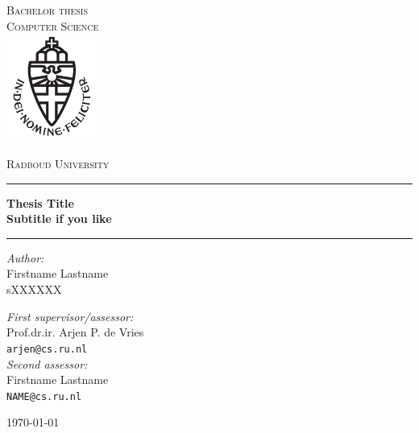 \documentclass[11pt,a4paper]{report}
\begin{document}
\begin{titlepage}
\begin{center}
\textsc{\LARGE Bachelor thesis\\Computer Science}\\[1.5cm]
\includegraphics[height=100pt]{logo}

\vspace{0.4cm}
\textsc{\Large Radboud University}\\[1cm]
\hrule
\vspace{0.4cm}
\textbf{\huge Thesis Title\\[0.3cm]
\LARGE Subtitle if you like
}\\[0.4cm]
\hrule
\vspace{2cm}
\begin{minipage}[t]{0.45\textwidth}
\begin{flushleft} \large
\textit{Author:}\\
Firstname Lastname\\
sXXXXXX
\end{flushleft}
\end{minipage}
\begin{minipage}[t]{0.45\textwidth}
\begin{flushright} \large
\textit{First supervisor/assessor:}\\
Prof.dr.ir. Arjen P. de Vries\\
\texttt{arjen@cs.ru.nl}\\[1.3cm]
\textit{Second assessor:}\\
Firstname Lastname\\
\texttt{NAME@cs.ru.nl}
\end{flushright}
\end{minipage}
\vfill
{\large \today}
\end{center}
\end{titlepage}


\tableofcontents








\appendix

\end{document}
